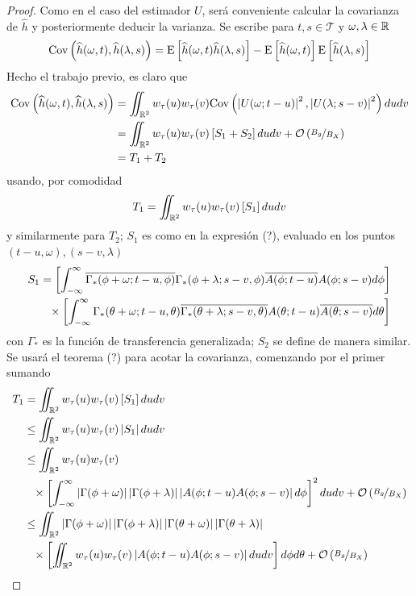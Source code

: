 \begin{proof}
Como en el caso del estimador $U$, será conveniente calcular la covarianza de $\widehat{h}$ y posteriormente deducir la varianza. Se escribe para $t, s \in \mathcal{T}$ y $\omega, \lambda \in \mathbb{R}$
\begin{equation}
\mathrm{Cov}\left( \widehat{h}(\omega, t),\widehat{h}(\lambda, s) \right) = \mathrm{E}\left[ \widehat{h}(\omega, t)\widehat{h}(\lambda, s) \right] - \mathrm{E}\left[ \widehat{h}(\omega, t) \right]\mathrm{E}\left[ \widehat{h}(\lambda, s) \right]
\end{equation}
Hecho el trabajo previo, es claro que
\begin{align*}
\mathrm{Cov}\left( \widehat{h}(\omega, t), \widehat{h}(\lambda, s) \right) &=
\iint_{\mathbb{R}^{2}} w_\tau(u) w_\tau(v) \mathrm{Cov}\left( \left| U(\omega; t-u) \right|^{2},\left| U(\lambda; s-v) \right|^{2} \right) du dv \\
&=
\iint_{\mathbb{R}^{2}} w_\tau(u) w_\tau(v) \left[ S_1 + S_2 \right] du dv + \mathcal{O}\left( \nicefrac{B_g}{B_X} \right) \\
&= T_1 + T_2
\end{align*}
usando, por comodidad
\begin{equation}
T_1 = \iint_{\mathbb{R}^{2}} w_\tau(u) w_\tau(v) \left[ S_1 \right] du dv
\end{equation}
y similarmente para $T_2$; $S_1$ es como en la expresión (?), evaluado en los puntos $(t-u,\omega), (s-v, \lambda)$
\begin{align*}
S_1 &=
 \left[ \intR \overline{\Gamma_*(\phi + \omega; t-u, \phi)} \Gamma_*(\phi+ \lambda; s-v, \phi)
 \overline{A(\phi; t-u)} A(\phi; s-v) d\phi \right] \\
 &\pheq \times \left[ \intR \Gamma_*(\theta+ \omega; t-u, \theta) 
  \overline{\Gamma_*(\theta + \lambda; s-v, \theta)}  
 A(\theta; t-u)   \overline{A(\theta; s-v)} d\theta \right] 
\end{align*}
con $\Gamma_*$ es la función de transferencia generalizada; $S_2$ se define de manera similar.
Se usará el teorema (?) para acotar la covarianza, comenzando por el primer sumando
\begin{align*}
T_1 &= 
\iint_{\R^{2}} w_\tau(u) w_\tau(v) \left[ S_1 \right] du dv \\
&\leq
\iint_{\R^{2}} w_\tau(u) w_\tau(v) \abso{ S_1 } du dv \\
&\leq 
\iint_{\R^{2}} 
w_\tau(u) w_\tau(v) \\
&\pheq 
 \times \left[ \intR
 \abso{\Gamma(\phi + \omega)} \abso{\Gamma(\phi+ \lambda)}
 \abso{A(\phi; t-u) A(\phi; s-v)} d\phi \right]^{2}
 du dv + \orden{\nicefrac{B_g}{B_X}} \\
&\leq 
\iint_{\R^{2}} \abso{\Gamma(\phi + \omega)} \abso{\Gamma(\phi+ \lambda)}
\abso{\Gamma(\theta + \omega)} \abso{\Gamma(\theta+ \lambda)} \\
&\pheq 
 \times \left[ \iint_{\R^{2}}  w_\tau(u) w_\tau(v)
 \abso{A(\phi; t-u) A(\phi; s-v)} du dv \right]
 d\phi d\theta + \orden{\nicefrac{B_g}{B_X}} \\
\end{align*}
\end{proof}


